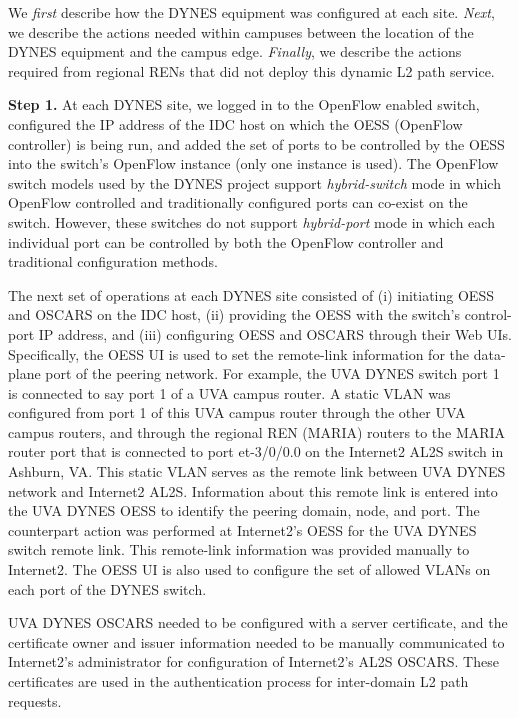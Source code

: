 {We \emph{first} describe how the
DYNES equipment was configured at each site.
\emph{Next}, we describe the actions needed within campuses between the
location of the DYNES equipment and the campus edge. \emph{Finally},
we describe the actions required from regional RENs
that did not deploy this dynamic L2 path service.

\textbf{Step 1.} At each DYNES site, we logged in to the OpenFlow
enabled switch, configured the IP address of the IDC host
on which the OESS (OpenFlow controller) is being run, and
added the set of ports to be controlled by the OESS into
the switch's OpenFlow instance (only one instance is used).
The OpenFlow switch models used by the DYNES project
support \emph{hybrid-switch} mode in which OpenFlow controlled
and traditionally configured ports can co-exist on the switch.
However, these switches do not support \emph{hybrid-port} mode in
which each individual port can be controlled by both the
OpenFlow controller and traditional configuration methods.

The next set of operations at each DYNES site consisted of
(i) initiating OESS and OSCARS on the IDC host, (ii) providing the OESS with the switch's control-port IP address,
and (iii) configuring OESS and OSCARS through their Web
UIs. Specifically, the OESS UI is used to set the remote-link
information for the data-plane port of the peering network.
For example, the UVA DYNES switch port 1 is connected
to say port 1 of a UVA campus router. A static VLAN was
configured from port 1 of this UVA campus router through
the other UVA campus routers, and through the regional
REN (MARIA) routers to the MARIA router port that is
connected to port et-3/0/0.0 on the Internet2 AL2S switch
in Ashburn, VA. This static VLAN serves as the remote
link between UVA DYNES network and Internet2 AL2S.
Information about this remote link is entered into the UVA
DYNES OESS to identify the peering domain, node, and
port. The counterpart action was performed at Internet2's
OESS for the UVA DYNES switch remote link. This remote-link information was provided manually to Internet2. The
OESS UI is also used to configure the set of allowed VLANs
on each port of the DYNES switch.

UVA DYNES OSCARS needed to be configured with a server certificate, and the certificate owner and issuer information needed to be manually communicated to Internet2's administrator for configuration of Internet2's AL2S OSCARS. These certificates are used in the authentication
process for inter-domain L2 path requests.

}
